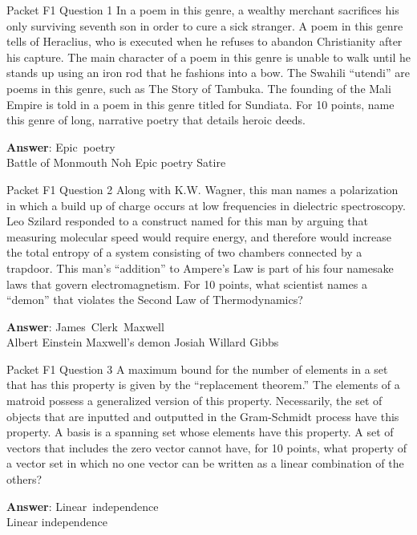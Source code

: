 \begin{frame}{Packet F1 Question 1}
In a poem in this genre,   a wealthy merchant sacrifices his only surviving seventh son in order to cure a sick stranger. A   poem in this genre tells of Heraclius, who is executed when he refuses to abandon Christianity after his capture. The main character of a poem in this genre is unable to walk until he stands up using an iron rod that he fashions into a bow. The Swahili “utendi” are poems in this genre, such as The Story of Tambuka. The founding of the Mali Empire is told in a poem in this genre titled for Sundiata. For 10 points, name this genre of long, narrative poetry that   details heroic deeds.    

\textbf{Answer}: Epic\ poetry\\
 Battle of Monmouth
 Noh
 Epic poetry
 Satire
\end{frame}

\begin{frame}{Packet F1 Question 2}
Along with K.W. Wagner, this man names a polarization in which a build up of charge occurs at low frequencies in dielectric spectroscopy. Leo Szilard responded to a construct named for this man by arguing   that measuring molecular speed would require energy, and therefore would increase the total entropy of a system consisting of two chambers connected by a trapdoor.   This man’s “addition” to Ampere’s Law is part of his   four namesake laws that govern electromagnetism. For 10 points,   what scientist names a “demon” that violates the Second Law of Thermodynamics?  

\textbf{Answer}: James\ Clerk\ Maxwell\\
 Albert Einstein
 Maxwell's demon
 Josiah Willard Gibbs
\end{frame}

\begin{frame}{Packet F1 Question 3}
A maximum bound for the number of elements in a set that has this property is given by the “replacement theorem.” The elements of a matroid possess   a generalized version of this property. Necessarily, the set of objects that are inputted and outputted in the Gram-Schmidt process have this property. A basis is a spanning set whose elements have this property. A set of vectors that   includes the zero vector cannot have, for 10 points, what property of a vector set in which no one vector can be written as a linear combination   of the others?  

\textbf{Answer}: Linear\ independence\\
 Linear independence
\end{frame}

